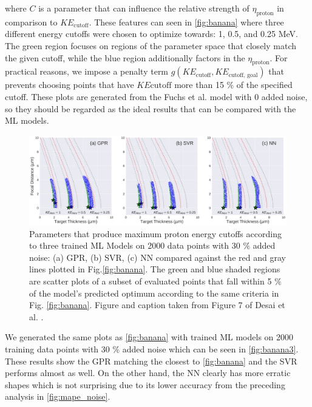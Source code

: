 where $C$ is a parameter that can influence the relative strength of $\eta_\text{proton}$ in comparison to $KE_\text{cutoff}$. These features can seen in \autoref{fig:banana} where three different energy cutoffs were chosen to optimize towards: 1, 0.5, and 0.25 MeV. The green region focuses on regions of the parameter space that closely match the given cutoff, while the blue region additionally factors in the $\eta_\text{proton}$. For practical reasons, we impose a penalty term $g(KE_\text{cutoff}, KE_\text{cutoff, goal})$ that prevents choosing points that have $KE\text{cutoff}$ more than 15 \% of the specified cutoff. These plots are generated from the Fuchs et al. model with 0 added noise, so they should be regarded as the ideal results that can be compared with the \gls{ML} models.

\begin{figure}
	\centering 
	\includegraphics[width=0.95\linewidth]{planning/images/paper1/model_optim_noise=30_pts=2000.pdf}
	\caption{Parameters that produce maximum proton energy cutoffs according to three trained ML Models on 2000 data points with 30 $\%$ added noise: (a) GPR, (b) SVR, (c) NN compared against the red and gray lines plotted in Fig.\ref{fig:banana}. The green and blue shaded regions are scatter plots of a subset of evaluated points that fall within 5 $\%$ of the model's predicted optimum according to the same criteria in Fig. \ref{fig:banana}. Figure and caption taken from Figure 7 of Desai et al. \cite{Desai_2024_CPP}.}
	\label{fig:banana3}
\end{figure}

We generated the same plots as \autoref{fig:banana} with trained \gls{ML} models on 2000 training data points with 30 \% added noise which can be seen in \autoref{fig:banana3}. These results show the \gls{GPR} matching the closest to \autoref{fig:banana} and the \gls{SVR} performs almost as well. On the other hand, the \gls{NN} clearly has more erratic shapes which is not surprising due to its lower accuracy from the preceding analysis in \autoref{fig:mape_noise}. 

